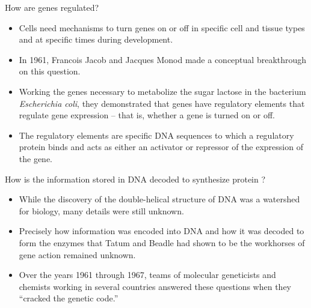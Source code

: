 \documentclass[11pt,dvipsnames,ignorenonframetext,aspectratio=169]{beamer}
\providecommand{\tightlist}{%
  \setlength{\itemsep}{0pt}\setlength{\parskip}{0pt}}
\begin{document}
\begin{frame}{How are genes regulated?}
\protect\hypertarget{how-are-genes-regulated}{}

\begin{itemize}
\tightlist
\item
  Cells need mechanisms to turn genes on or off in specific cell and
  tissue types and at specific times during development.
\item
  In 1961, Francois Jacob and Jacques Monod made a conceptual
  breakthrough on this question.
\item
  Working the genes necessary to metabolize the sugar lactose in the
  bacterium \emph{Escherichia coli}, they demonstrated that genes have
  regulatory elements that regulate gene expression -- that is, whether
  a gene is turned on or off.
\item
  The regulatory elements are specific DNA sequences to which a
  regulatory protein binds and acts as either an activator or repressor
  of the expression of the gene.
\end{itemize}

\end{frame}

\begin{frame}{How is the information stored in DNA decoded to synthesize
protein ?}
\protect\hypertarget{how-is-the-information-stored-in-dna-decoded-to-synthesize-protein}{}

\begin{itemize}
\tightlist
\item
  While the discovery of the double-helical structure of DNA was a
  watershed for biology, many details were still unknown.
\item
  Precisely how information was encoded into DNA and how it was decoded
  to form the enzymes that Tatum and Beadle had shown to be the
  workhorses of gene action remained unknown.
\item
  Over the years 1961 through 1967, teams of molecular geneticists and
  chemists working in several countries answered these questions when
  they ``cracked the genetic code.''
\end{itemize}

\end{frame}
\end{document}
